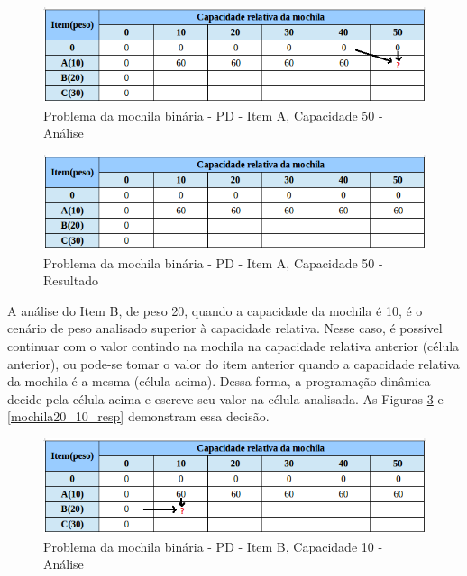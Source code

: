 \begin{itemize}
\FloatBarrier
\begin{figure}[!h]
\centering
\includegraphics[keepaspectratio=true,scale=0.6]{figuras/matriz10_50.png}
\caption{Problema da mochila binária - PD - Item A, Capacidade 50 - Análise}
\label{matriz10_50}
\end{figure}

\FloatBarrier
\begin{figure}[!h]
\centering
\includegraphics[keepaspectratio=true,scale=0.6]{figuras/matriz10_50_resp.png}
\caption{Problema da mochila binária - PD - Item A, Capacidade 50 - Resultado}
\label{matriz10_50_resp}
\end{figure}
 
A análise do Item B, de peso 20, quando a capacidade da mochila é 10, é o cenário de peso analisado superior à capacidade relativa. Nesse caso, é possível continuar com o valor contindo na mochila na capacidade relativa anterior (célula anterior), ou pode-se tomar o valor do item anterior quando a capacidade relativa da mochila é a mesma (célula acima). Dessa forma, a programação dinâmica decide pela célula acima e escreve seu valor na célula analisada. As Figuras \ref{matriz20_10} e \ref{mochila20_10_resp} demonstram essa decisão.

\FloatBarrier
\begin{figure}[!h]
\centering
\includegraphics[keepaspectratio=true,scale=0.5]{figuras/matriz20_10.png}
\caption{Problema da mochila binária - PD - Item B, Capacidade 10 - Análise}
\label{matriz20_10}
\end{figure}


\end{itemize}
